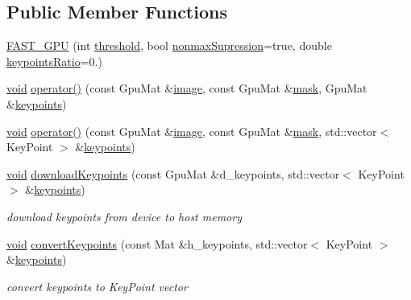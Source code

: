 \subsection*{Public Member Functions}
\begin{DoxyCompactItemize}
\item 
\hyperlink{classcv_1_1gpu_1_1FAST__GPU_ad5907710e0b1b235b78a0296a75c3f91}{F\-A\-S\-T\-\_\-\-G\-P\-U} (int \hyperlink{classcv_1_1gpu_1_1FAST__GPU_a28b49bef52f11f2c366bf9167c52d985}{threshold}, bool \hyperlink{classcv_1_1gpu_1_1FAST__GPU_a73b328bc50cd60cec18f85bea59dff1c}{nonmax\-Supression}=true, double \hyperlink{classcv_1_1gpu_1_1FAST__GPU_a82f6122d0207b098068279d6fd75b973}{keypoints\-Ratio}=0.)
\item 
\hyperlink{legacy_8hpp_a8bb47f092d473522721002c86c13b94e}{void} \hyperlink{classcv_1_1gpu_1_1FAST__GPU_ac5e6d94500f5ed888ec5f04fae878d02}{operator()} (const Gpu\-Mat \&\hyperlink{legacy_8hpp_ad62b16ab219ae2483e8a3d921c44cc97}{image}, const Gpu\-Mat \&\hyperlink{tracking_8hpp_a6b13ecd2fd6ec7ad422f1d7863c3ad19}{mask}, Gpu\-Mat \&\hyperlink{compat_8hpp_af95b6678bbbdd664ed15fe6d4190d355}{keypoints})
\item 
\hyperlink{legacy_8hpp_a8bb47f092d473522721002c86c13b94e}{void} \hyperlink{classcv_1_1gpu_1_1FAST__GPU_acb06758e5e302eb7fd7c86c7e4013231}{operator()} (const Gpu\-Mat \&\hyperlink{legacy_8hpp_ad62b16ab219ae2483e8a3d921c44cc97}{image}, const Gpu\-Mat \&\hyperlink{tracking_8hpp_a6b13ecd2fd6ec7ad422f1d7863c3ad19}{mask}, std\-::vector$<$ Key\-Point $>$ \&\hyperlink{compat_8hpp_af95b6678bbbdd664ed15fe6d4190d355}{keypoints})
\item 
\hyperlink{legacy_8hpp_a8bb47f092d473522721002c86c13b94e}{void} \hyperlink{classcv_1_1gpu_1_1FAST__GPU_abeed037b263638de3586c346208166cf}{download\-Keypoints} (const Gpu\-Mat \&d\-\_\-keypoints, std\-::vector$<$ Key\-Point $>$ \&\hyperlink{compat_8hpp_af95b6678bbbdd664ed15fe6d4190d355}{keypoints})
\begin{DoxyCompactList}\small\item\em download keypoints from device to host memory \end{DoxyCompactList}\item 
\hyperlink{legacy_8hpp_a8bb47f092d473522721002c86c13b94e}{void} \hyperlink{classcv_1_1gpu_1_1FAST__GPU_a4add5048b7d1909796ba6c91ac0e4045}{convert\-Keypoints} (const Mat \&h\-\_\-keypoints, std\-::vector$<$ Key\-Point $>$ \&\hyperlink{compat_8hpp_af95b6678bbbdd664ed15fe6d4190d355}{keypoints})
\begin{DoxyCompactList}\small\item\em convert keypoints to Key\-Point vector \end{DoxyCompactList}\item 

\end{DoxyCompactItemize}
